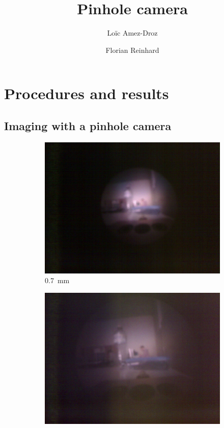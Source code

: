 \documentclass[a4paper, 12pt]{paper}
\author{Loïc Amez-Droz \and Florian Reinhard}
\title{Pinhole camera}
\begin{document}

\section{Procedures and results}
\subsection{Imaging with a pinhole camera}

\begin{figure}[H]
    \centering
    \begin{subfigure}[t]{0.45\textwidth}
        \includegraphics[width=\textwidth]{img/00mm}
        \caption{\SI{0.7}{\milli\meter}}
    \end{subfigure}
    \begin{subfigure}[t]{0.45\textwidth}
        \includegraphics[width=\textwidth]{img/05mm}

\end{subfigure}
\end{figure}
\end{document}
